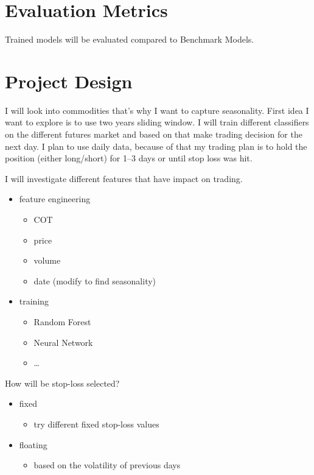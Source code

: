\documentclass[final,2p]{elsarticle}
\begin{document}
\section{Evaluation Metrics}

Trained models will be evaluated compared to Benchmark Models.

\section{Project Design}

I will look into commodities that's why I want to capture seasonality.
First idea I want to explore is to use two years sliding window. I will train different classifiers on the different futures market and 
based on that make trading decision for the next day. I plan to use daily data, because of that my trading plan is to hold the position (either long/short) for 1--3 days or until stop loss was hit.

I will investigate different features that have impact on trading.

\begin{itemize}
    \item feature engineering
    \begin{itemize}
        \item COT
        \item price
        \item volume
        \item date (modify to find seasonality)
    \end{itemize}
    \item training
    \begin{itemize}
        \item Random Forest
        \item Neural Network
        \item \ldots
    \end{itemize}
\end{itemize}

How will be stop-loss selected?
\begin{itemize}
    \item fixed
        \begin{itemize}
            \item try different fixed stop-loss values
        \end{itemize}
    \item floating
        \begin{itemize}
            \item based on the volatility of previous days
        \end{itemize}
\end{itemize}
\end{document}
